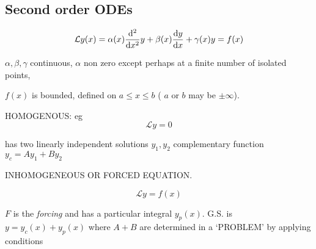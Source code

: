 \documentclass[a4paper]{article}
\begin{document}
\subsection{Second order ODEs}

\[ \mathcal{L} y(x) = \alpha(x) \frac{\mathrm{d}^{2} }{\mathrm{d} x^{2} } y + \beta(x) \frac{\mathrm{d} y }{\mathrm{d} x } + \gamma(x)  y = f(x) \]

$ \alpha, \beta, \gamma $ continuous, $ \alpha $ non zero except perhaps at a finite number of isolated points, 

$ f(x) $ is bounded, defined on $ a \leq x \leq b $ ( $ a $ or $ b $ may be $ \pm \infty $).

HOMOGENOUS: eg 
\[ \mathcal{L} y = 0  \]

has two linearly independent solutions $ y_{1},y_{2} $ complementary function $ y_{c} = Ay_{1} + By_{2} $

INHOMOGENEOUS OR FORCED EQUATION. 

\[ \mathcal{L} y = f(x)  \]

$ F $ is the \emph{forcing} and has a particular integral $ y_{p} (x) $. G.S. is $ y = y_{c}(x) + y_{p}(x) $ where $ A + B $ are determined in a `PROBLEM' by applying conditions
\end{document}
